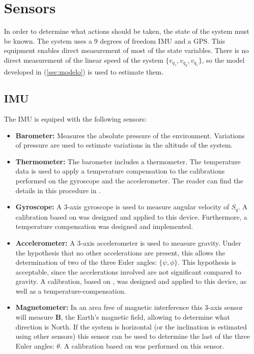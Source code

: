 \documentclass[conference]{IEEEtran}
\newcommand{\refp}[1]{(\ref{#1})}
\begin{document}
\section{Sensors}

In order to determine what actions should be taken, the state of the system must be known. The system uses a 9 degrees of freedom IMU and a GPS. This equipment enables direct measurement of most of the state variables. There is no direct measurement of the linear speed of the system $\{v_{q_z},v_{q_y},v_{q_z}\}$, so the model developed in \refp{sec:modelo} is used to estimate them. 

\subsection{IMU}
\label{sec:sensors-imu}

The IMU is equiped with the following sensors:
\begin{itemize}
\item \textbf{Barometer:} Measures the absolute pressure of the environment. Variations of pressure are used to estimate variations in the altitude of the system.
\item \textbf{Thermometer:} The barometer includes a thermometer. The temperature data is used to apply a temperature compensation to the calibrations performed on the gyroscope and the accelerometer. The reader can find the details in this procedure in \cite{bib:nosotros}.
\item \textbf{Gyroscope:} A 3-axis gyroscope is used to measure angular velocity of $S_q$. A calibration based on \cite{bib:calib_imu} was designed and applied to this device. Furthermore, a temperature compensation was designed and implemented.
\item \textbf{Accelerometer:} A 3-axis accelerometer is used to measure gravity. Under the hypothesis that no other accelerations are present, this allows the determination of two of the three Euler angles: $\{\psi, \phi\}$. This hypothesis is acceptable, since the accelerations involved are not significant compared to gravity. A calibration, based on \cite{bib:calib_imu}, was designed and applied to this device, as well as a temperature-compensation.
\item \textbf{Magnetometer:} In an area free of magnetic interference this 3-axis sensor will measure $\mathbf{B}$, the Earth's magnetic field, allowing to determine what direction is North. If the system is horizontal (or the inclination is estimated using other sensors) this sensor can be used to determine the last of the three Euler angles: $\theta$. A calibration based on \cite{bib:bola,bib:alain} was performed on this sensor.
\end{itemize}
\end{document}
